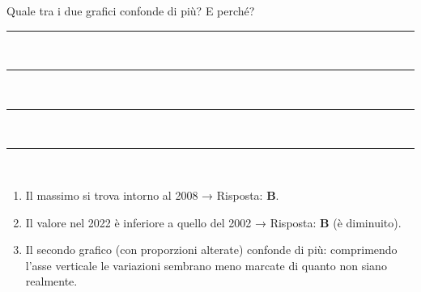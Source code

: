 \begin{question}[ID=1.3, subtitle={Grafici fuorvianti: scala dell'asse}, tags={istogramma, grafici fuorvianti}, difficulty=facile]
\noindent
Quale tra i due grafici confonde di più? E perché?\vspace{10pt}\\
\rule{\linewidth}{0.2pt} \vspace{0.1pt} \\
\rule{\linewidth}{0.2pt} \vspace{0.1pt} \\
\rule{\linewidth}{0.2pt} \vspace{0.1pt} \\
\rule{\linewidth}{0.2pt} \vspace{0.1pt} \\
\begin{solution}
\begin{enumerate}
    \item Il massimo si trova intorno al 2008 → Risposta: \textbf{B}.
    \item Il valore nel 2022 è inferiore a quello del 2002 → Risposta: \textbf{B} (è diminuito).
    \item Il secondo grafico (con proporzioni alterate) confonde di più: comprimendo l'asse verticale le variazioni sembrano meno marcate di quanto non siano realmente.
\end{enumerate}
\end{solution}
\end{question}


